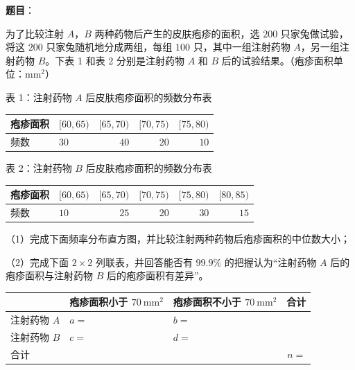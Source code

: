 \begin{answer}

\textbf{题目}：

为了比较注射 $A$，$B$ 两种药物后产生的皮肤疱疹的面积，选 $200$ 只家兔做试验，将这 $200$ 只家兔随机地分成两组，每组 $100$ 只，其中一组注射药物 $A$，另一组注射药物 $B$。下表 1 和表 2 分别是注射药物 $A$ 和 $B$ 后的试验结果。（疱疹面积单位：$\mathrm{mm}^2$）

表 1：注射药物 $A$ 后皮肤疱疹面积的频数分布表

\begin{center}
\begin{tabular}{llrrr}
\toprule
疱疹面积 & $[60,65)$ & $[65,70)$ & $[70,75)$ & $[75,80)$ \\
\midrule
频数 & $30$ & $40$ & $20$ & $10$ \\
\bottomrule
\end{tabular}
\end{center}

表 2：注射药物 $B$ 后皮肤疱疹面积的频数分布表

\begin{center}
\begin{tabular}{llrrrr}
\toprule
疱疹面积 & $[60,65)$ & $[65,70)$ & $[70,75)$ & $[75,80)$ & $[80,85)$ \\
\midrule
频数 & $10$ & $25$ & $20$ & $30$ & $15$ \\
\bottomrule
\end{tabular}
\end{center}

（1）完成下面频率分布直方图，并比较注射两种药物后疱疹面积的中位数大小；
\nopagebreak[4]
\begin{center}\end{center}
\nopagebreak[4]
（2）完成下面 $2\times2$ 列联表，并回答能否有 $99.9\%$ 的把握认为“注射药物 $A$ 后的疱疹面积与注射药物 $B$ 后的疱疹面积有差异”。

\begin{center}
\begin{tabular}{lllr}
\toprule
 & 疱疹面积小于 $70\ \mathrm{mm}^2$ & 疱疹面积不小于 $70\ \mathrm{mm}^2$ & 合计 \\
\midrule
注射药物 $A$ & $a=$ & $b=$ &  \\
注射药物 $B$ & $c=$ & $d=$ &  \\
合计 &  &  & $n=$ \\
\bottomrule
\end{tabular}
\end{center}


\end{answer}
